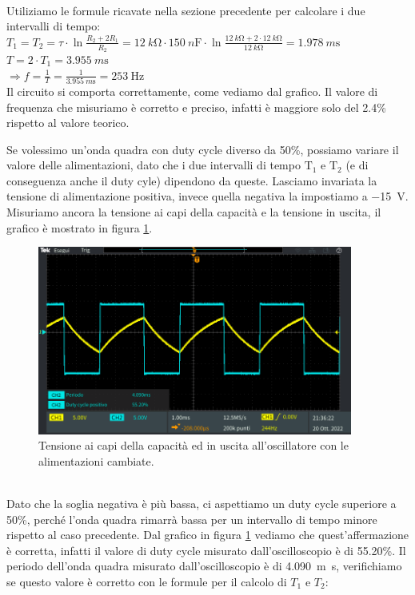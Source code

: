 \documentclass{report}
\begin{document}
\\Utiliziamo le formule ricavate nella sezione precedente per calcolare i due intervalli di tempo:
\\[4pt]\indent$\displaystyle{T_1=T_2=\tau\cdot\ln\frac{R_2+2R_1}{R_2}=\SI{12}{k\ohm}\cdot\SI{150}{n\farad}\cdot\ln\frac{\SI{12}{k\ohm}+2\cdot\SI{12}{k\ohm}}{\SI{12}{k\ohm}}=\SI{1.978}{m\second}}$
\\[4pt]\indent$\displaystyle{T=2\cdot T_1 = \SI{3.955}{m\second}}$
\\[4pt]\indent$\Rightarrow\displaystyle{f=\frac{1}{T}=\frac{1}{\SI{3.955}{m\second}}=\SI{253}{\hertz}}$
\\[4pt]Il circuito si comporta correttamente, come vediamo dal grafico. Il valore di frequenza che misuriamo è corretto e preciso, infatti è maggiore solo del 2.4\% rispetto al valore teorico.\par
Se volessimo un'onda quadra con duty cycle diverso da 50\%, possiamo variare il valore delle alimentazioni, dato che i due intervalli di tempo $\mathrm{T_1}$ e $\mathrm{T_2}$ (e di conseguenza anche il duty cyle) dipendono da queste. Lasciamo invariata la tensione di alimentazione positiva, invece quella negativa la impostiamo a \SI{-15}{\volt}. Misuriamo ancora la tensione ai capi della capacità e la tensione in uscita, il grafico è mostrato in figura \ref{figura:oscillo3_2}.
\begin{figure}[h!]
	\centering
	\includegraphics[height=6.2cm]{immagini/TEK00032}
	\caption{Tensione ai capi della capacità ed in uscita all'oscillatore con le alimentazioni cambiate.}
	\label{figura:oscillo3_2}
\end{figure}
\\Dato che la soglia negativa è più bassa, ci aspettiamo un duty cycle superiore a 50\%, perché l'onda quadra rimarrà bassa per un intervallo di tempo minore rispetto al caso precedente. Dal grafico in figura \ref{figura:oscillo3_2} vediamo che quest'affermazione è corretta, infatti il valore di duty cycle misurato dall'oscilloscopio è di 55.20\%. Il periodo dell'onda quadra misurato dall'oscilloscopio è di \SI{4.090}{m\second}, verifichiamo se questo valore è corretto con le formule per il calcolo di $T_1$ e $T_2$:
\end{document}
